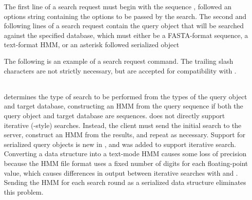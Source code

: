 \documentclass[notoc,justified,openany]{tufte-book}    %
\newcommand{\hmmserver}{\mono{hmmserver}\xspace}
\newcommand{\Hmmserver}{\mono{Hmmserver}\xspace}
\newcommand{\hmmpgmd}{\mono{hmmpgmd}\xspace}
\begin{document}
The first line of a search request must begin with the sequence , followed an options string containing the options to be passed by the search.  The second and following lines of a search request contain the query object that will be searched against the specified database, which must either be a FASTA-format sequence, a text-format HMM, or an asterisk followed serialized  object

The following is an example of a search request command. The trailing slash characters are not strictly necessary, but are accepted for compatibility with \hmmpgmd.\\
\vspace{1ex}
\\
\vspace{1ex}

\Hmmserver determines the type of search to be performed from the types of the query object and target database, constructing an HMM from the query sequence if both the query object and target database are sequences.  \Hmmserver does not directly support iterative (-style) searches.  Instead, the client must send the initial search to the server, construct an HMM from the results, and repeat as necessary.  Support for serialized  query objects is new in \hmmserver, and was added to support iterative search.  Converting a  data structure into a text-mode HMM causes some loss of precision because the HMM file format uses a fixed number of digits for each floating-point value, which causes differences in output between iterative searches with \hmmserver and .  Sending the HMM for each search round as a serialized data structure eliminates this problem.
\end{document}
